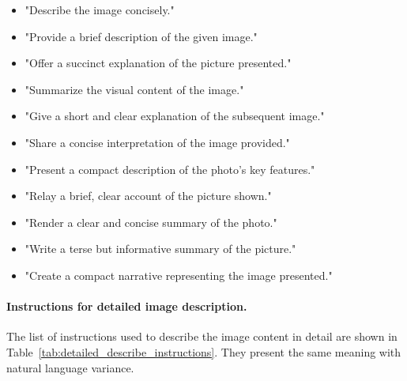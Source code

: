 \begin{table}[h!]\centering

\begin{minipage}{0.99\columnwidth}\vspace{0mm}    \centering
\begin{tcolorbox} 
    \centering
    \small
     \hspace{-6mm}
\begin{itemize}[leftmargin=7.5mm]
\setlength{\itemsep}{2pt}
\item "Describe the image concisely."
\item "Provide a brief description of the given image."
\item "Offer a succinct explanation of the picture presented."
\item "Summarize the visual content of the image."
\item "Give a short and clear explanation of the subsequent image."
\item "Share a concise interpretation of the image provided."
\item "Present a compact description of the photo's key features."
\item "Relay a brief, clear account of the picture shown."
\item "Render a clear and concise summary of the photo."
\item "Write a terse but informative summary of the picture."
\item "Create a compact narrative representing the image presented."
\end{itemize}

\end{tcolorbox}
    
\vspace{-2mm}
\caption{The list of instructions for brief image description.}
    \label{tab:concise_describe_instructions}
\end{minipage}
\end{table}

\paragraph{Instructions for detailed image description.}
The list of instructions used to describe the image content in detail are shown in Table~\ref{tab:detailed_describe_instructions}. They present the same meaning with natural language variance.


